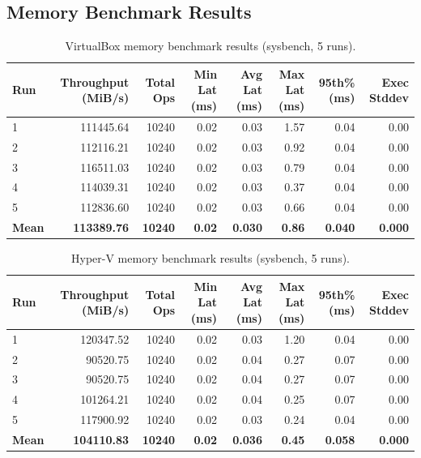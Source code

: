 \documentclass[a4paper, 12pt]{article}
\theoremstyle{plain}
\theoremstyle{definition}
\theoremstyle{remark}
\begin{document}
    \begin{landscape}
    \section{Memory Benchmark Results}
    \begin{table}[H]
    \centering
    \caption{VirtualBox memory benchmark results (sysbench, 5 runs).}
    \label{tab:mem-vbox}
    \begin{tabular}{lrrrrrrr}
    \hline
    \textbf{Run} & \textbf{Throughput (MiB/s)} & \textbf{Total Ops} & \textbf{Min Lat (ms)} & \textbf{Avg Lat (ms)} & \textbf{Max Lat (ms)} & \textbf{95th\% (ms)} & \textbf{Exec Stddev} \\
    \hline
    1 & 111445.64 & 10240 & 0.02 & 0.03 & 1.57 & 0.04 & 0.00 \\
    2 & 112116.21 & 10240 & 0.02 & 0.03 & 0.92 & 0.04 & 0.00 \\
    3 & 116511.03 & 10240 & 0.02 & 0.03 & 0.79 & 0.04 & 0.00 \\
    4 & 114039.31 & 10240 & 0.02 & 0.03 & 0.37 & 0.04 & 0.00 \\
    5 & 112836.60 & 10240 & 0.02 & 0.03 & 0.66 & 0.04 & 0.00 \\
    \hline
    \textbf{Mean} & \textbf{113389.76} & \textbf{10240} & \textbf{0.02} & \textbf{0.030} & \textbf{0.86} & \textbf{0.040} & \textbf{0.000} \\
    \hline
    \end{tabular}
    \end{table}

    \begin{table}[H]
    \centering
    \caption{Hyper-V memory benchmark results (sysbench, 5 runs).}
    \label{tab:mem-hyperv}
    \begin{tabular}{lrrrrrrr}
    \hline
    \textbf{Run} & \textbf{Throughput (MiB/s)} & \textbf{Total Ops} & \textbf{Min Lat (ms)} & \textbf{Avg Lat (ms)} & \textbf{Max Lat (ms)} & \textbf{95th\% (ms)} & \textbf{Exec Stddev} \\
    \hline
    1 & 120347.52 & 10240 & 0.02 & 0.03 & 1.20 & 0.04 & 0.00 \\
    2 &  90520.75 & 10240 & 0.02 & 0.04 & 0.27 & 0.07 & 0.00 \\
    3 &  90520.75 & 10240 & 0.02 & 0.04 & 0.27 & 0.07 & 0.00 \\
    4 & 101264.21 & 10240 & 0.02 & 0.04 & 0.25 & 0.07 & 0.00 \\
    5 & 117900.92 & 10240 & 0.02 & 0.03 & 0.24 & 0.04 & 0.00 \\
    \hline
    \textbf{Mean} & \textbf{104110.83} & \textbf{10240} & \textbf{0.02} & \textbf{0.036} & \textbf{0.45} & \textbf{0.058} & \textbf{0.000} \\
    \hline
    \end{tabular}
    \end{table}
    \end{landscape}
\end{document}
